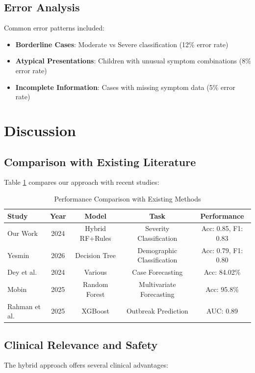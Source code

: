 \documentclass[conference]{IEEEtran}
\begin{document}
\subsection{Error Analysis}
Common error patterns included:

\begin{itemize}
\item \textbf{Borderline Cases}: Moderate vs Severe classification (12\% error rate)
\item \textbf{Atypical Presentations}: Children with unusual symptom combinations (8\% error rate)
\item \textbf{Incomplete Information}: Cases with missing symptom data (5\% error rate)
\end{itemize}

\section{Discussion}

\subsection{Comparison with Existing Literature}
Table \ref{tab:comparison} compares our approach with recent studies:

\begin{table}[h]
\centering
\caption{Performance Comparison with Existing Methods}
\label{tab:comparison}
\begin{tabular}{@{}lcccc@{}}
\toprule
\textbf{Study} & \textbf{Year} & \textbf{Model} & \textbf{Task} & \textbf{Performance} \\
\midrule
Our Work & 2024 & Hybrid RF+Rules & Severity Classification & Acc: 0.85, F1: 0.83 \\
Yesmin \cite{yesmin2026} & 2026 & Decision Tree & Demographic Classification & Acc: 0.79, F1: 0.80 \\
Dey et al. \cite{dey2024} & 2024 & Various & Case Forecasting & Acc: 84.02\% \\
Mobin \cite{mobin2025} & 2025 & Random Forest & Multivariate Forecasting & Acc: 95.8\% \\
Rahman et al. \cite{rahman2025} & 2025 & XGBoost & Outbreak Prediction & AUC: 0.89 \\
\bottomrule
\end{tabular}
\end{table}

\subsection{Clinical Relevance and Safety}
The hybrid approach offers several clinical advantages:
\end{document}
